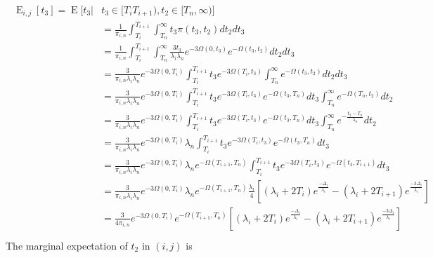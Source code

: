 \documentclass{article}
\DeclareMathOperator{\E}{E}
\begin{document}
\begin{align}
    \begin{split}
        \E_{i,j}[t_3] = \E\big[t_3|&t_3 \in [T_i T_{i+1}),t_2 \in [T_n,\infty) \big]\\
        &= \frac{1}{\pi_{i,n}}\int_{T_i}^{T_{i+1}}\int_{T_n}^{\infty}t_3\pi(t_3,t_2)dt_2dt_3\\
        &= \frac{1}{\pi_{i,n}}\int_{T_i}^{T_{i+1}}\int_{T_n}^{\infty}
            \frac{3t_3}{\lambda_i \lambda_n}e^{-3\Omega(0,t_3)}e^{-\Omega(t_3,t_2)}dt_2dt_3\\
        &=\frac{3}{\pi_{i,n}\lambda_i\lambda_n}e^{-3\Omega(0,T_i)}
            \int_{T_i}^{T_{i+1}}t_3e^{-3\Omega(T_i,t_3)}\int_{T_n}^{\infty}e^{-\Omega(t_3,t_2)}dt_2dt_3\\
        &=\frac{3}{\pi_{i,n}\lambda_i\lambda_n}e^{-3\Omega(0,T_i)}
            \int_{T_i}^{T_{i+1}}t_3e^{-3\Omega(T_i,t_3)}e^{-\Omega(t_3,T_n)}dt_3\int_{T_n}^{\infty}e^{-\Omega(T_n,t_2)}dt_2\\
        &=\frac{3}{\pi_{i,n}\lambda_i\lambda_n}e^{-3\Omega(0,T_i)}
            \int_{T_i}^{T_{i+1}}t_3e^{-3\Omega(T_i,t_3)}e^{-\Omega(t_3,T_n)}dt_3\int_{T_n}^{\infty}e^{-\frac{t_2-T_n}{\lambda_n}}dt_2\\
        &=\frac{3}{\pi_{i,n}\lambda_i\lambda_n}e^{-3\Omega(0,T_i)}\lambda_n
            \int_{T_i}^{T_{i+1}}t_3e^{-3\Omega(T_i,t_3)}e^{-\Omega(t_3,T_n)}dt_3\\
        &=\frac{3}{\pi_{i,n}\lambda_i\lambda_n}e^{-3\Omega(0,T_i)}
            \lambda_ne^{-\Omega(T_{i+1},T_n)}
            \int_{T_i}^{T_{i+1}}t_3e^{-3\Omega(T_i,t_3)}e^{-\Omega(t_3,T_{i+1})}dt_3\\
        &=\frac{3}{\pi_{i,n}\lambda_i\lambda_n}e^{-3\Omega(0,T_i)}
            \lambda_ne^{-\Omega(T_{i+1},T_n)}
            \frac{\lambda_i}{4}\left[(\lambda_i+2T_i)e^{\frac{-\Delta_i}{\lambda_i}}-(\lambda_i+2T_{i+1})e^{\frac{-3\Delta_i}{\lambda_i}}\right]\\
        &=\frac{3}{4\pi_{i,n}}e^{-3\Omega(0,T_i)}
            e^{-\Omega(T_{i+1},T_n)}
            \left[(\lambda_i+2T_i)e^{\frac{-\Delta_i}{\lambda_i}}-(\lambda_i+2T_{i+1})e^{\frac{-3\Delta_i}{\lambda_i}}\right]\\
    \end{split}
    \label{eq:Et3}
\end{align}
The marginal expectation of $t_2$ in $(i,j)$ is 
\end{document}
